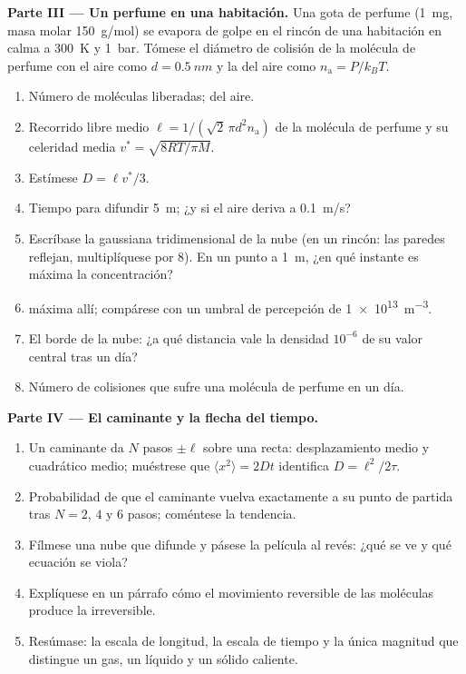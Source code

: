 \begin{problem}
\textbf{Parte III --- Un perfume en una habitación.}
Una gota de perfume (\qty{1}{mg}, masa molar \qty{150}{g/mol}) se evapora
de golpe en el rincón de una habitación en calma a \qty{300}{K} y \qty{1}{bar}.
Tómese el diámetro de colisión de la molécula de perfume con el aire como $d =
\qty{0.5}{nm}$ y la  del aire como $n_{\text{a}} = P/k_BT$.
\begin{enumerate}[resume]
  \item Número de moléculas liberadas;  del aire.
  \item Recorrido libre medio $\ell = 1/(\sqrt2\,\pi d^2 n_{\text{a}})$ de la
        molécula de perfume y su celeridad media $v^* = \sqrt{8RT/\pi M}$.
  \item Estímese $D = \ell v^*/3$.
  \item Tiempo para difundir \qty{5}{m}; ¿y si el aire deriva a
        \qty{0.1}{m/s}?
  \item Escríbase la gaussiana tridimensional de la nube (en un rincón:
        las paredes reflejan, multiplíquese por $8$). En un punto a \qty{1}{m},
        ¿en qué instante es máxima la concentración?
  \item {} máxima allí; compárese con un umbral de percepción
        de \qty{1e13}{m^{-3}}.
  \item El borde de la nube: ¿a qué distancia vale la densidad $10^{-6}$ de
        su valor central tras un día?
  \item Número de colisiones que sufre una molécula de perfume en un día.
\end{enumerate}

\textbf{Parte IV --- El caminante y la flecha del tiempo.}
\begin{enumerate}[resume]
  \item Un caminante da $N$ pasos $\pm\ell$ sobre una recta: desplazamiento medio y
        cuadrático medio; muéstrese que $\langle x^2\rangle = 2Dt$
        identifica $D = \ell^2/2\tau$.
  \item Probabilidad de que el caminante vuelva exactamente a su punto de partida tras
        $N = 2$, $4$ y $6$ pasos; coméntese la tendencia.
  \item Fílmese una nube que difunde y pásese la película al revés: ¿qué se
        ve y qué ecuación se viola?
  \item Explíquese en un párrafo cómo el movimiento reversible de las moléculas
        produce la  irreversible.
  \item Resúmase: la escala de longitud, la escala de tiempo y la única
        magnitud que distingue un gas, un líquido y un sólido caliente.
\end{enumerate}
\end{problem}
